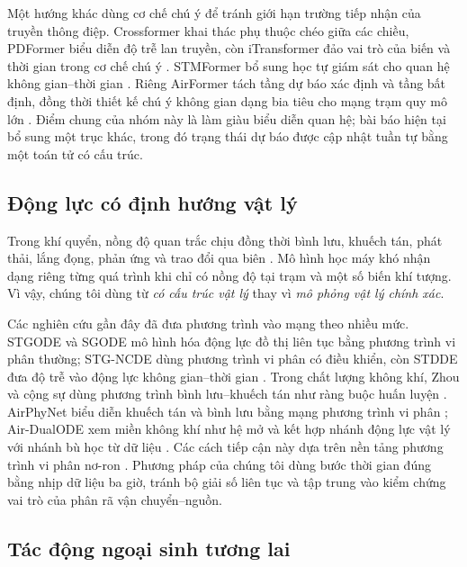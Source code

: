 \documentclass[10pt,a4paper]{article}
\begin{document}
Một hướng khác dùng cơ chế chú ý để tránh giới hạn trường tiếp nhận của truyền thông điệp. Crossformer khai thác phụ thuộc chéo giữa các chiều, PDFormer biểu diễn độ trễ lan truyền, còn iTransformer đảo vai trò của biến và thời gian trong cơ chế chú ý \citep{zhang2023crossformer,jiang2023pdformer,liu2024itransformer}. STMFormer bổ sung học tự giám sát cho quan hệ không gian--thời gian \citep{li2025stmformer}. Riêng AirFormer tách tầng dự báo xác định và tầng bất định, đồng thời thiết kế chú ý không gian dạng bia tiêu cho mạng trạm quy mô lớn \citep{liang2023airformer}. Điểm chung của nhóm này là làm giàu biểu diễn quan hệ; bài báo hiện tại bổ sung một trục khác, trong đó trạng thái dự báo được cập nhật tuần tự bằng một toán tử có cấu trúc.

\subsection{Động lực có định hướng vật lý}

Trong khí quyển, nồng độ quan trắc chịu đồng thời bình lưu, khuếch tán, phát thải, lắng đọng, phản ứng và trao đổi qua biên \citep{seinfeld2016atmospheric}. Mô hình học máy khó nhận dạng riêng từng quá trình khi chỉ có nồng độ tại trạm và một số biến khí tượng. Vì vậy, chúng tôi dùng từ \emph{có cấu trúc vật lý} thay vì \emph{mô phỏng vật lý chính xác}.

Các nghiên cứu gần đây đã đưa phương trình vào mạng theo nhiều mức. STGODE và SGODE mô hình hóa động lực đồ thị liên tục bằng phương trình vi phân thường; STG-NCDE dùng phương trình vi phân có điều khiển, còn STDDE đưa độ trễ vào động lực không gian--thời gian \citep{fang2021stgode,chen2024sgode,choi2022stgncde,long2024stdde}. Trong chất lượng không khí, Zhou và cộng sự dùng phương trình bình lưu--khuếch tán như ràng buộc huấn luyện \citep{zhou2022theory}. AirPhyNet biểu diễn khuếch tán và bình lưu bằng mạng phương trình vi phân \citep{hettige2024airphynet}; Air-DualODE xem miền không khí như hệ mở và kết hợp nhánh động lực vật lý với nhánh bù học từ dữ liệu \citep{tian2025airdualode}. Các cách tiếp cận này dựa trên nền tảng phương trình vi phân nơ-ron \citep{chen2018neuralode}. Phương pháp của chúng tôi dùng bước thời gian đúng bằng nhịp dữ liệu ba giờ, tránh bộ giải số liên tục và tập trung vào kiểm chứng vai trò của phân rã vận chuyển--nguồn.

\subsection{Tác động ngoại sinh tương lai}
\end{document}
